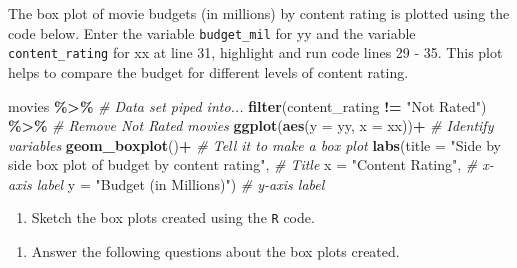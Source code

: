 \documentclass[
]{report}
\newenvironment{Shaded}{\begin{snugshade}}{\end{snugshade}}
\newcommand{\CommentTok}[1]{\textcolor[rgb]{0.56,0.35,0.01}{\textit{#1}}}
\newcommand{\DataTypeTok}[1]{\textcolor[rgb]{0.13,0.29,0.53}{#1}}
\newcommand{\KeywordTok}[1]{\textcolor[rgb]{0.13,0.29,0.53}{\textbf{#1}}}
\newcommand{\NormalTok}[1]{#1}
\newcommand{\OperatorTok}[1]{\textcolor[rgb]{0.81,0.36,0.00}{\textbf{#1}}}
\newcommand{\StringTok}[1]{\textcolor[rgb]{0.31,0.60,0.02}{#1}}
\providecommand{\tightlist}{%
  \setlength{\itemsep}{0pt}\setlength{\parskip}{0pt}}
\begin{document}
The box plot of movie budgets (in millions) by content rating is plotted using the code below. Enter the variable \texttt{budget\_mil} for yy and the variable \texttt{content\_rating} for xx at line 31, highlight and run code lines 29 - 35. This plot helps to compare the budget for different levels of content rating.

\begin{Shaded}
\begin{Highlighting}[]
\NormalTok{movies }\OperatorTok{\%\textgreater{}\%}\StringTok{  }\CommentTok{\# Data set piped into...}
\StringTok{  }\KeywordTok{filter}\NormalTok{(content\_rating }\OperatorTok{!=}\StringTok{ "Not Rated"}\NormalTok{) }\OperatorTok{\%\textgreater{}\%}\StringTok{ }\CommentTok{\# Remove Not Rated movies}
\StringTok{  }\KeywordTok{ggplot}\NormalTok{(}\KeywordTok{aes}\NormalTok{(}\DataTypeTok{y =}\NormalTok{ yy, }\DataTypeTok{x =}\NormalTok{ xx))}\OperatorTok{+}\StringTok{  }\CommentTok{\# Identify variables}
\StringTok{  }\KeywordTok{geom\_boxplot}\NormalTok{()}\OperatorTok{+}\StringTok{  }\CommentTok{\# Tell it to make a box plot}
\StringTok{  }\KeywordTok{labs}\NormalTok{(}\DataTypeTok{title =} \StringTok{"Side by side box plot of budget by content rating"}\NormalTok{,  }\CommentTok{\# Title}
       \DataTypeTok{x =} \StringTok{"Content Rating"}\NormalTok{,    }\CommentTok{\# x{-}axis label}
       \DataTypeTok{y =} \StringTok{"Budget (in Millions)"}\NormalTok{)  }\CommentTok{\# y{-}axis label}
\end{Highlighting}
\end{Shaded}

\begin{enumerate}
\def\labelenumi{\arabic{enumi}.}
\setcounter{enumi}{12}
\tightlist
\item
  Sketch the box plots created using the \texttt{R} code.
\end{enumerate}

\vspace{1.5in}

\begin{enumerate}
\def\labelenumi{\arabic{enumi}.}
\setcounter{enumi}{13}
\tightlist
\item
  Answer the following questions about the box plots created.
\end{enumerate}
\end{document}
